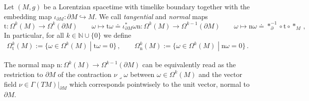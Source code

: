 \begin{Definition}\label{Def: tangential and normal component}
	Let $(M,g)$ be a Lorentzian spacetime with timelike boundary together with the embedding map $\iota_{\partial M}:\partial M\hookrightarrow M$. We call {\em tangential} and {\em normal} maps 
	\begin{subequations}\label{Eqn: tangential and normal maps}
		\begin{equation}\label{Eqn: tangential map}
		\mathrm{t}\colon\Omega^k(M)\to\Omega^k(\partial M)\qquad\omega\mapsto\mathrm{t}\omega\doteq\iota_{\partial M}^*\omega
		\end{equation}
		\begin{equation}\label{Eqn: normal maps}
		\mathrm{n}\colon\Omega^k(M)\to\Omega^{k-1}(\partial M)\qquad\omega\mapsto\mathrm{n}\omega\doteq\ast_{\partial}^{-1}\circ\mathrm{t}\circ\ast_M\,,
		\end{equation}
	\end{subequations}
	In particular, for all $k\in\mathbb{N}\cup\{0\}$ we define
	\begin{align}\label{Eqn: k-forms with vanishing tangential or normal component}
	\Omega_{\mathrm{t}}^k(M):=\lbrace\omega\in\Omega^k(M)\;|\;\mathrm{t}\omega=0\rbrace\,,\qquad
	\Omega_{\mathrm{n}}^k(M):=\lbrace\omega\in\Omega^k(M)\;|\;\mathrm{n}\omega=0\rbrace\,.
	\end{align}
\end{Definition}

\begin{remark}
	The normal map $\mathrm{n}:\Omega^k(M)\to\Omega^{k-1}(\partial M)$ can be equivalently read as the restriction to $\partial M$ of the contraction $\nu\operatorname{\lrcorner}\omega$ between $\omega\in\Omega^k(M)$ and the vector field $\nu\in\Gamma(TM)|_{\partial M}$ which corresponds pointwisely to the unit vector, normal to $\partial M$.
\end{remark}

